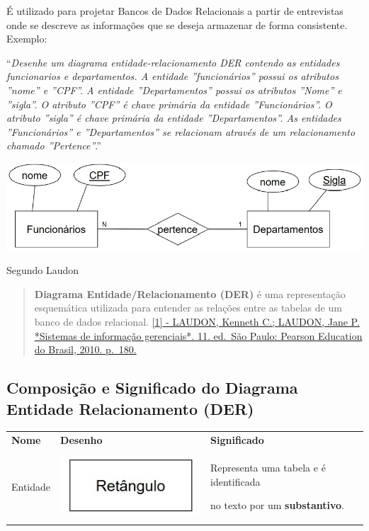 \documentclass[
]{book}
\begin{document}
É utilizado para projetar Bancos de Dados Relacionais a partir de entrevistas onde se descreve as informações que se deseja armazenar de forma consistente. Exemplo:

``\emph{Desenhe um diagrama entidade-relacionamento DER contendo as entidades funcionarios e departamentos. A entidade ''funcionários'' possui os atributos ''nome'' e ''CPF''. A entidade ''Departamentos'' possui os atributos ''Nome'' e ''sigla''. O atributo ''CPF'' é chave primária da entidade ''Funcionários''. O atributo ''sigla'' é chave primária da entidade ''Departamentos''. As entidades ''Funcionários'' e ''Departamentos'' se relacionam através de um relacionamento chamado ''Pertence''}.''

\includegraphics{images/5-bi/02-Modelo-Entidade-Relacionamento.jpg}

Segundo Laudon

\begin{quote}
\textbf{Diagrama Entidade/Relacionamento (DER)} é uma representação esquemática utilizada para entender as relações entre as tabelas de um banco de dados relacional. \hyperref[laudon-kenneth-c.-laudon-jane-p.-sistemas-de-informauxe7uxe3o-gerenciais.-11.-ed.-suxe3o-paulo-pearson-education-do-brasil-2010.-p.-180.]{{[}1{]} - LAUDON, Kenneth C.; LAUDON, Jane P. *Sistemas de informação gerenciais*. 11. ed.~São Paulo: Pearson Education do Brasil, 2010. p.~180.}
\end{quote}

\subsection{Composição e Significado do Diagrama Entidade Relacionamento (DER)}\label{composiuxe7uxe3o-e-significado-do-diagrama-entidade-relacionamento-der}

\begin{longtable}[]{@{}
  >{\centering\arraybackslash}p{}
  >{\centering\arraybackslash}p{}
  >{\centering\arraybackslash}p{}@{}}
\toprule\noalign{}
\endhead
\bottomrule\noalign{}
\endlastfoot
\textbf{Nome} & \textbf{Desenho} & \textbf{Significado} \\
Entidade & \includegraphics{images/5-bi/03-retangulo.jpg} & Representa uma tabela e é identificada

no texto por um \textbf{substantivo}. \\
\end{longtable}
\end{document}
